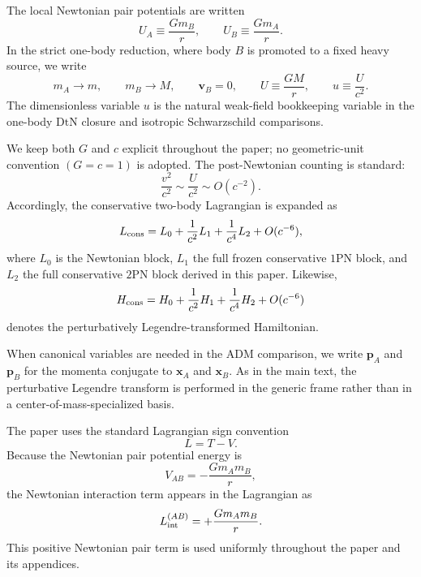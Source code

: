 \documentclass[11pt]{article}
\newcommand{\pvec}{\mathbf p}
\newcommand{\vct}{\mathbf v}
\newcommand{\OnePN}{\mathrm{1PN}}
\newcommand{\TwoPN}{\mathrm{2PN}}
\newcommand{\ADM}{\mathrm{ADM}}
\newcommand{\DtN}{\mathrm{DtN}}
\begin{document}
The local Newtonian pair potentials are written
\begin{equation}
U_A\equiv \frac{Gm_B}{r},
\qquad
U_B\equiv \frac{Gm_A}{r}.
\label{eq:notation-2pn-local-potentials}
\end{equation}
In the strict one-body reduction, where body \(B\) is promoted to a fixed heavy source,
we write
\begin{equation}
m_A\to m,
\qquad
m_B\to M,
\qquad
\vct_B=0,
\qquad
U\equiv \frac{GM}{r},
\qquad
u\equiv \frac{U}{c^2}.
\label{eq:notation-2pn-one-body}
\end{equation}
The dimensionless variable \(u\) is the natural weak-field bookkeeping variable in the
one-body \(\DtN\) closure and isotropic Schwarzschild comparisons.

We keep both \(G\) and \(c\) explicit throughout the paper; no geometric-unit convention
\((G=c=1)\) is adopted.  The post-Newtonian counting is standard:
\begin{equation}
\frac{v^2}{c^2}\sim \frac{U}{c^2}\sim O(c^{-2}).
\label{eq:notation-2pn-counting}
\end{equation}
Accordingly, the conservative two-body Lagrangian is expanded as
\begin{equation}
L_{\rm cons}=L_0+\frac{1}{c^2}L_1+\frac{1}{c^4}L_2+O(c^{-6}),
\label{eq:notation-2pn-lagrangian-expansion}
\end{equation}
where \(L_0\) is the Newtonian block, \(L_1\) the full frozen conservative \(\OnePN\)
block, and \(L_2\) the full conservative \(\TwoPN\) block derived in this paper.
Likewise,
\begin{equation}
H_{\rm cons}=H_0+\frac{1}{c^2}H_1+\frac{1}{c^4}H_2+O(c^{-6})
\label{eq:notation-2pn-hamiltonian-expansion}
\end{equation}
denotes the perturbatively Legendre-transformed Hamiltonian.

When canonical variables are needed in the \(\ADM\) comparison, we write
\(\pvec_A\) and \(\pvec_B\) for the momenta conjugate to
\(\mathbf x_A\) and \(\mathbf x_B\).  As in the main text, the perturbative Legendre
transform is performed in the generic frame rather than in a center-of-mass-specialized
basis.

The paper uses the standard Lagrangian sign convention
\begin{equation}
L=T-V.
\label{eq:notation-2pn-LTV}
\end{equation}
Because the Newtonian pair potential energy is
\begin{equation}
V_{AB}=-\frac{Gm_A m_B}{r},
\label{eq:notation-2pn-VAB}
\end{equation}
the Newtonian interaction term appears in the Lagrangian as
\begin{equation}
L_{\rm int}^{(AB)}=+\frac{Gm_A m_B}{r}.
\label{eq:notation-2pn-Lint}
\end{equation}
This positive Newtonian pair term is used uniformly throughout the paper and its
appendices.
\end{document}
